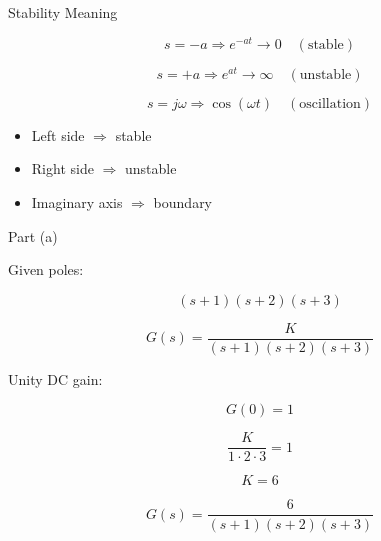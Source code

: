 \documentclass{beamer}
\begin{document}
\begin{frame}{Stability Meaning}

\begin{equation}
s = -a \Rightarrow e^{-at} \rightarrow 0 \quad (\text{stable})
\end{equation}

\begin{equation}
s = +a \Rightarrow e^{at} \rightarrow \infty \quad (\text{unstable})
\end{equation}

\begin{equation}
s = j\omega \Rightarrow \cos(\omega t) \quad (\text{oscillation})
\end{equation}

\vspace{0.3cm}

\begin{itemize}
    \item Left side $\Rightarrow$ stable
    \item Right side $\Rightarrow$ unstable
    \item Imaginary axis $\Rightarrow$ boundary
\end{itemize}

\end{frame}


\begin{frame}{Part (a)}

Given poles:

\begin{equation}
(s+1)(s+2)(s+3)
\end{equation}

\begin{equation}
G(s) = \frac{K}{(s+1)(s+2)(s+3)}
\end{equation}

Unity DC gain:

\begin{equation}
G(0) = 1
\end{equation}

\begin{equation}
\frac{K}{1 \cdot 2 \cdot 3} = 1
\end{equation}

\begin{equation}
K = 6
\end{equation}

\begin{equation}
\boxed{G(s) = \frac{6}{(s+1)(s+2)(s+3)}}
\end{equation}

\end{frame}
\end{document}
